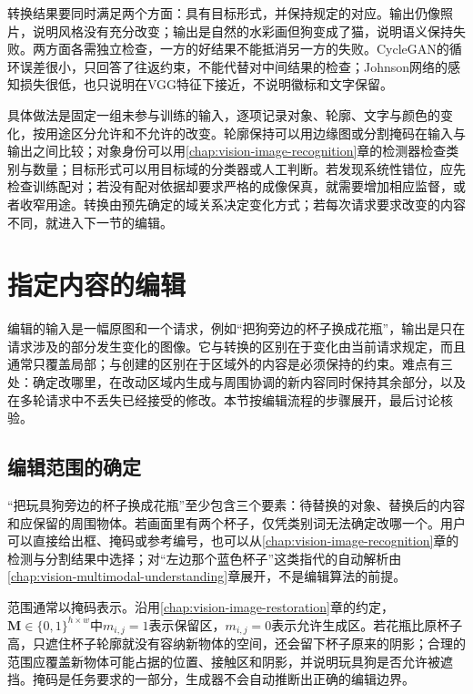 转换结果要同时满足两个方面：具有目标形式，并保持规定的对应。输出仍像照片，说明风格没有充分改变；输出是自然的水彩画但狗变成了猫，说明语义保持失败。两方面各需独立检查，一方的好结果不能抵消另一方的失败。CycleGAN的循环误差很小，只回答了往返约束，不能代替对中间结果的检查；Johnson网络的感知损失很低，也只说明在VGG特征下接近，不说明徽标和文字保留。

具体做法是固定一组未参与训练的输入，逐项记录对象、轮廓、文字与颜色的变化，按用途区分允许和不允许的改变。轮廓保持可以用边缘图或分割掩码在输入与输出之间比较；对象身份可以用\ref{chap:vision-image-recognition}章的检测器检查类别与数量；目标形式可以用目标域的分类器或人工判断。若发现系统性错位，应先检查训练配对；若没有配对依据却要求严格的成像保真，就需要增加相应监督，或者收窄用途。转换由预先确定的域关系决定变化方式；若每次请求要求改变的内容不同，就进入下一节的编辑。

\section{指定内容的编辑}
\label{sec:vision-generation-editing}

编辑的输入是一幅原图和一个请求，例如“把狗旁边的杯子换成花瓶”，输出是只在请求涉及的部分发生变化的图像。它与转换的区别在于变化由当前请求规定，而且通常只覆盖局部；与创建的区别在于区域外的内容是必须保持的约束。难点有三处：确定改哪里，在改动区域内生成与周围协调的新内容同时保持其余部分，以及在多轮请求中不丢失已经接受的修改。本节按编辑流程的步骤展开，最后讨论核验。

\subsection{编辑范围的确定}
\label{sec:vision-generation-editing-scope}

“把玩具狗旁边的杯子换成花瓶”至少包含三个要素：待替换的对象、替换后的内容和应保留的周围物体。若画面里有两个杯子，仅凭类别词无法确定改哪一个。用户可以直接给出框、掩码或参考编号，也可以从\ref{chap:vision-image-recognition}章的检测与分割结果中选择；对“左边那个蓝色杯子”这类指代的自动解析由\ref{chap:vision-multimodal-understanding}章展开，不是编辑算法的前提。

范围通常以掩码表示。沿用\ref{chap:vision-image-restoration}章的约定，$\bm{M}\in\{0,1\}^{h\times w}$中$m_{i,j}=1$表示保留区，$m_{i,j}=0$表示允许生成区。若花瓶比原杯子高，只遮住杯子轮廓就没有容纳新物体的空间，还会留下杯子原来的阴影；合理的范围应覆盖新物体可能占据的位置、接触区和阴影，并说明玩具狗是否允许被遮挡。掩码是任务要求的一部分，生成器不会自动推断出正确的编辑边界。


